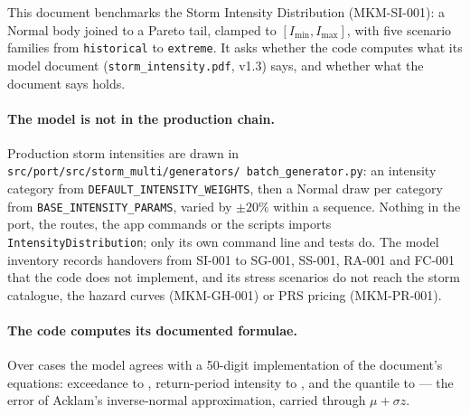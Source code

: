 \documentclass[11pt,a4paper]{article}
\begin{document}
\sloppy

\mkmtitlepage
\mkmlegalpage

\tableofcontents
\clearpage

\mkmexecsummary

This document benchmarks the Storm Intensity Distribution (MKM-SI-001): a Normal
body joined to a Pareto tail, clamped to $[I_{\min},I_{\max}]$, with five scenario
families from \texttt{historical} to \texttt{extreme}. It asks whether the code
computes what its model document (\texttt{storm\_intensity.pdf}, v1.3) says, and
whether what the document says holds.

\paragraph{The model is not in the production chain.} Production storm
intensities are drawn in \texttt{src/port/src/storm\_multi/generators/
batch\_generator.py}: an intensity category from \texttt{DEFAULT\_INTENSITY\_WEIGHTS},
then a Normal draw per category from \texttt{BASE\_INTENSITY\_PARAMS}, varied by
$\pm20\%$ within a sequence. Nothing in the port, the routes, the app commands or the
scripts imports \texttt{IntensityDistribution}; only its own command line and tests
do. The model inventory records handovers from SI-001 to SG-001, SS-001, RA-001 and
FC-001 that the code does not implement, and its stress scenarios do not reach the
storm catalogue, the hazard curves (MKM-GH-001) or PRS pricing (MKM-PR-001).

\paragraph{The code computes its documented formulae.} Over \bmCases{} cases the
model agrees with a 50-digit implementation of the document's equations: exceedance
to \bmExcWorst, return-period intensity to \bmRpWorst, and the quantile to
\bmInvWorst{} --- the error of Acklam's inverse-normal approximation, carried through
$\mu+\sigma z$. \bmWolframConfirms
\end{document}
